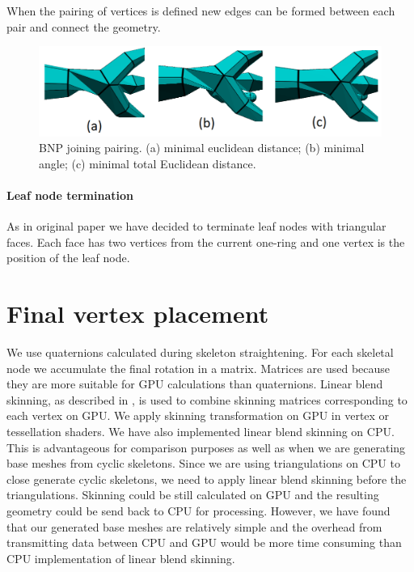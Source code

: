 When the pairing of vertices is defined new edges can be formed between each pair and connect the geometry.

\begin{figure}[h]
    \centering
    \includegraphics[width=\textwidth]{images/join_pairing.png}
    \caption[BNP joining pairing]{BNP joining pairing. (a) minimal euclidean distance; (b) minimal angle; (c) minimal total Euclidean distance.}
    \label{fig:join_pairing_ilu}
\end{figure}

\paragraph{Leaf node termination}
As in original paper \cite{sqm} we have decided to terminate leaf nodes with triangular faces. Each face has two vertices from the current one-ring and one vertex is the position of the leaf node.

\section{Final vertex placement}\label{sec:fvp}
We use quaternions calculated during skeleton straightening.
For each skeletal node we accumulate the final rotation in a matrix.
Matrices are used because they are more suitable for GPU calculations than quaternions.
Linear blend skinning, as described in \cite{Kavan-07-SDQ}, is used to combine skinning matrices corresponding to each vertex on GPU.
We apply skinning transformation on GPU in vertex or tessellation shaders.
We have also implemented linear blend skinning on CPU.
This is advantageous for comparison purposes as well as when we are generating base meshes from cyclic skeletons.
Since we are using triangulations on CPU to close generate cyclic skeletons, we need to apply linear blend skinning before the triangulations.
Skinning could be still calculated on GPU and the resulting geometry could be send back to CPU for processing. However, we have found that our generated base meshes are relatively simple and the overhead from transmitting data between CPU and GPU would be more time consuming than CPU implementation of linear blend skinning.

